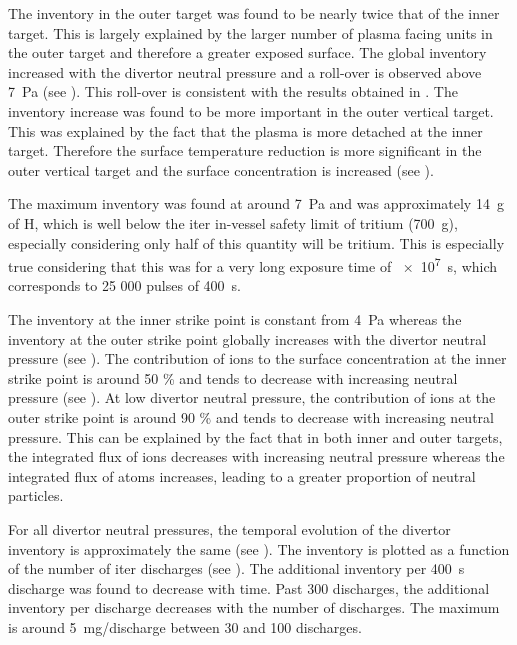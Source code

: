 The \gls{inventory} in the outer target was found to be nearly twice that of the inner target.
This is largely explained by the larger number of plasma facing units in the outer target and therefore a greater exposed surface.
The global \gls{inventory} increased with the \gls{divertor} neutral pressure and a roll-over is observed above \SI{7}{Pa} (see ).
This roll-over is consistent with the results obtained in .
The \gls{inventory} increase was found to be more important in the outer vertical target.
This was explained by the fact that the plasma is more detached at the inner target.
Therefore the surface temperature reduction is more significant in the outer vertical target and the surface concentration is increased (see ).

The maximum \gls{inventory} was found at around \SI{7}{Pa} and was approximately \SI{14}{g} of H, which is well below the \gls{iter} in-vessel safety limit of tritium (\SI{700}{g}), especially considering only half of this quantity will be tritium.
This is especially true considering that this was for a very long exposure time of \SI{e7}{s}, which corresponds to 25 000 pulses of \SI{400}{s}.


The inventory at the inner \gls{strike point} is constant from \SI{4}{Pa} whereas the inventory at the outer \gls{strike point} globally increases with the \gls{divertor} neutral pressure (see ).
The contribution of ions to the surface concentration at the inner strike point is around 50 \% and tends to decrease with increasing neutral pressure (see ).
At low \gls{divertor} neutral pressure, the contribution of ions at the outer strike point is around 90 \% and tends to decrease with increasing neutral pressure.
This can be explained by the fact that in both inner and outer targets, the integrated flux of ions decreases with increasing neutral pressure whereas the integrated flux of atoms increases, leading to a greater proportion of neutral particles.

For all \gls{divertor} neutral pressures, the temporal evolution of the \gls{divertor} \gls{inventory} is approximately the same (see ).
The \gls{inventory} is plotted as a function of the number of \gls{iter} discharges (see ).
The additional \gls{inventory} per \SI{400}{s} discharge was found to decrease with time.
Past 300 discharges, the additional \gls{inventory} per discharge decreases with the number of discharges.
The maximum is around \SI{5}{mg/discharge} between 30 and 100 discharges.

